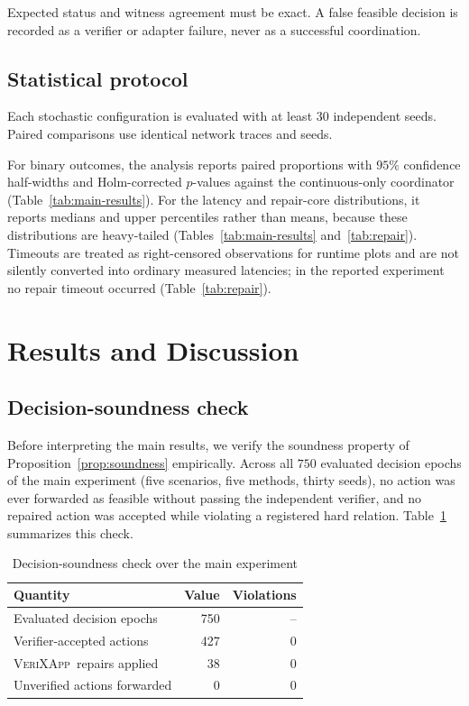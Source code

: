 \documentclass[pdflatex,sn-mathphys-num,iicol,oneside]{sn-jnl}
\newcommand{\method}{\textsc{VeriXApp}}
\begin{document}
Expected status and witness agreement must be exact. A false feasible
decision is recorded as a verifier or adapter failure, never as a
successful coordination.

\subsection{Statistical protocol}

Each stochastic configuration is evaluated with at least
$30$ independent seeds. Paired comparisons use identical network
traces and seeds.

For binary outcomes, the analysis reports paired proportions with
$95\%$ confidence half-widths and Holm-corrected $p$-values against
the continuous-only coordinator (Table~\ref{tab:main-results}). For
the latency and repair-core distributions, it reports medians and
upper percentiles rather than means, because these distributions are
heavy-tailed (Tables~\ref{tab:main-results} and~\ref{tab:repair}).
Timeouts are treated as right-censored observations for runtime plots
and are not silently converted into ordinary measured latencies; in
the reported experiment no repair timeout occurred
(Table~\ref{tab:repair}).

\section{Results and Discussion}
\label{sec:results}

\subsection{Decision-soundness check}

Before interpreting the main results, we verify the soundness
property of Proposition~\ref{prop:soundness} empirically. Across all
$750$ evaluated decision epochs of the main experiment (five
scenarios, five methods, thirty seeds), no action was ever forwarded
as feasible without passing the independent verifier, and no repaired
action was accepted while violating a registered hard relation.
Table~\ref{tab:sanity} summarizes this check.

\begin{table}[t]
\centering
\caption{Decision-soundness check over the main experiment}
\label{tab:sanity}
\begin{tabular}{lrr}
\toprule
Quantity & Value & Violations\\
\midrule
Evaluated decision epochs & 750 & --\\
Verifier-accepted actions & 427 & 0\\
\method\ repairs applied & 38 & 0\\
Unverified actions forwarded & 0 & 0\\
\bottomrule
\end{tabular}
\end{table}
\end{document}
